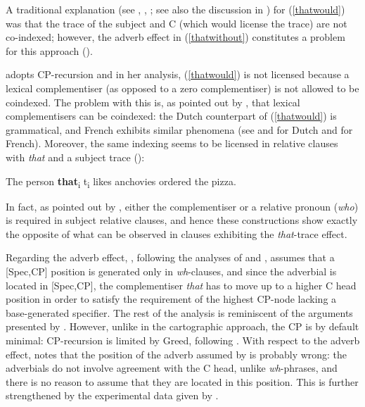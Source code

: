 A traditional explanation (see \citealt{sobin1991}, \citealt{culicover1993}, \citealt{browning1996}; see also the discussion in ) for (\ref{thatwould}) was that the trace of the subject and C (which would license the trace) are not co-indexed; however, the adverb effect in (\ref{thatwithout}) constitutes a problem for this approach (\citealt[528]{sobin2002}).

\citet{browning1996} adopts CP-recursion and in her analysis, (\ref{thatwould}) is not licensed because a lexical complementiser (as opposed to a zero complementiser) is not allowed to be coindexed. The problem with this is, as pointed out by \citet[530--531]{sobin2002}, that lexical complementisers can be coindexed: the Dutch counterpart of (\ref{thatwould}) is grammatical, and French exhibits similar phenomena (see \citealt{perlmutter1971} and \citealt{malingzaenen1978} for Dutch and \citealt{kayne1981} for French). Moreover, the same indexing seems to be licensed in relative clauses with \textit{that} and a subject trace (\citealt[537, ex. 7]{sobin2002}):

\ea The person \textbf{that}\textsubscript{i} t\textsubscript{i} likes anchovies ordered the pizza. 
\z

In fact, as pointed out by \citet[535]{sobin2002}, either the complementiser or a relative pronoun (\textit{who}) is required in subject relative clauses, and hence these constructions show exactly the opposite of what can be observed in clauses exhibiting the \textit{that}-trace effect.

Regarding the adverb effect, \citet{browning1996}, following the analyses of \citet{cheng1991diss} and \citet{watanabe1992}, assumes that a [Spec,CP] position is generated only in \textit{wh}-clauses, and since the adverbial is located in [Spec,CP], the complementiser \textit{that} has to move up to a higher C head position in order to satisfy the requirement of the highest CP-node lacking a base-generated specifier. The rest of the analysis is reminiscent of the arguments presented by \citet{rizzi1997}. However, unlike in the cartographic approach, the CP is by default minimal: CP-recursion is limited by Greed, following \citet{chomsky1993}. With respect to the adverb effect, \citet[531]{sobin2002} notes that the position of the adverb assumed by \citet{browning1996} is probably wrong: the adverbials do not involve agreement with the C head, unlike \textit{wh}-phrases, and there is no reason to assume that they are located in this position. This is further strengthened by the experimental data given by \citet[540--545]{sobin2002}.

